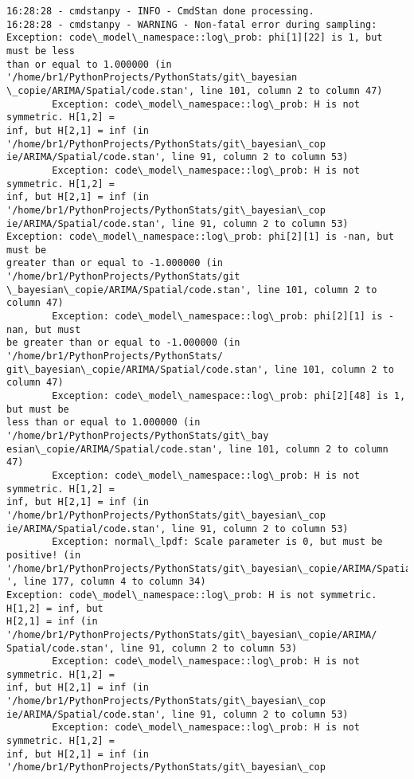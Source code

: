 \documentclass[11pt]{article}
\begin{document}
    \begin{Verbatim}[commandchars=\\\{\}]
16:28:28 - cmdstanpy - INFO - CmdStan done processing.
16:28:28 - cmdstanpy - WARNING - Non-fatal error during sampling:
Exception: code\_model\_namespace::log\_prob: phi[1][22] is 1, but must be less
than or equal to 1.000000 (in '/home/br1/PythonProjects/PythonStats/git\_bayesian
\_copie/ARIMA/Spatial/code.stan', line 101, column 2 to column 47)
        Exception: code\_model\_namespace::log\_prob: H is not symmetric. H[1,2] =
inf, but H[2,1] = inf (in '/home/br1/PythonProjects/PythonStats/git\_bayesian\_cop
ie/ARIMA/Spatial/code.stan', line 91, column 2 to column 53)
        Exception: code\_model\_namespace::log\_prob: H is not symmetric. H[1,2] =
inf, but H[2,1] = inf (in '/home/br1/PythonProjects/PythonStats/git\_bayesian\_cop
ie/ARIMA/Spatial/code.stan', line 91, column 2 to column 53)
Exception: code\_model\_namespace::log\_prob: phi[2][1] is -nan, but must be
greater than or equal to -1.000000 (in '/home/br1/PythonProjects/PythonStats/git
\_bayesian\_copie/ARIMA/Spatial/code.stan', line 101, column 2 to column 47)
        Exception: code\_model\_namespace::log\_prob: phi[2][1] is -nan, but must
be greater than or equal to -1.000000 (in '/home/br1/PythonProjects/PythonStats/
git\_bayesian\_copie/ARIMA/Spatial/code.stan', line 101, column 2 to column 47)
        Exception: code\_model\_namespace::log\_prob: phi[2][48] is 1, but must be
less than or equal to 1.000000 (in '/home/br1/PythonProjects/PythonStats/git\_bay
esian\_copie/ARIMA/Spatial/code.stan', line 101, column 2 to column 47)
        Exception: code\_model\_namespace::log\_prob: H is not symmetric. H[1,2] =
inf, but H[2,1] = inf (in '/home/br1/PythonProjects/PythonStats/git\_bayesian\_cop
ie/ARIMA/Spatial/code.stan', line 91, column 2 to column 53)
        Exception: normal\_lpdf: Scale parameter is 0, but must be positive! (in 
'/home/br1/PythonProjects/PythonStats/git\_bayesian\_copie/ARIMA/Spatial/code.stan
', line 177, column 4 to column 34)
Exception: code\_model\_namespace::log\_prob: H is not symmetric. H[1,2] = inf, but
H[2,1] = inf (in '/home/br1/PythonProjects/PythonStats/git\_bayesian\_copie/ARIMA/
Spatial/code.stan', line 91, column 2 to column 53)
        Exception: code\_model\_namespace::log\_prob: H is not symmetric. H[1,2] =
inf, but H[2,1] = inf (in '/home/br1/PythonProjects/PythonStats/git\_bayesian\_cop
ie/ARIMA/Spatial/code.stan', line 91, column 2 to column 53)
        Exception: code\_model\_namespace::log\_prob: H is not symmetric. H[1,2] =
inf, but H[2,1] = inf (in '/home/br1/PythonProjects/PythonStats/git\_bayesian\_cop

\end{Verbatim}
\end{document}
